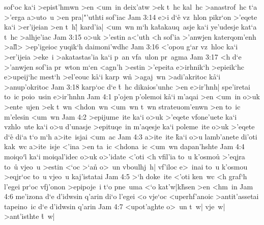 sof`oc
ka`i
>epist'hmwn
>en
<um~in
deix'atw
>ek
t~hc
kal~hc
>anastrof~hc
t`a
>'erga
a>uto~u
>en
pra|"'uthti
sof'iac\bibvsend
\vs Jam 3:14
e>i
d`e\r{}
vz~hlon
pikr`on
>'eqete
ka`i
>er'ijeian
>en
t~h|\r{}
kard'ia|
<um~wn
m`h
ka\r{t}akauq~asje
ka`i
ye'udesje
kat`a
t~hc
>alhje'iac\bibvsend
\vs Jam 3:15
o>uk
>'estin
a<'uth
<h
sof'ia
>'anwjen
katerqom'enh
>al\r{l}>
>ep'igeioc
yuqik`h
daimoni'wdhc\bibvsend
\vs Jam 3:16
<'opou
g`ar
vz~hloc
ka`i
>er'ijeia
>eke~i
>akatastas'ia
ka`i
p~an
vfa~ulon
pr~agma\bibvsend
\vs Jam 3:17
<h
d`e
>'anwjen
sof'ia
pr~wton
m`en
<agn'h
>estin
>'epeita
e>irhnik`h
>epieik`hc
e>upeij`hc
mest`h
>el'eouc
k\r{a}`i
karp~w\r{n}
>agaj~wn
>adi'akritoc
k\r{a}`i
>anup'okritoc\bibvsend
\vs Jam 3:18
karp`oc
d`e
\r{t}~hc
dikaios'unhc
>en
e>ir'hnh|
spe'iretai
to~ic
poio~usin
e>ir'hnhn\bibvsend
\vs Jam 4:1
p'ojen
p'olemoi
k\r{a}`i
m'aqai
>en
<um~in
o>uk
>ente~ujen
>ek
t~wn
<hdon~wn
<um~wn
t~wn
strateuom'enwn
>en
to~ic
m'elesin
<um~wn\bibvsend
\vs Jam 4:2
>epijume~ite
ka`i
o>uk
>'eqete
vfone'uete
ka`i
vzhlo~ute
ka`i
o>u
d'unasje
>epituqe~in
m'aqesje
ka`i
poleme~ite
o>uk
>'eqete
d`e\r{}
di`a
t`o
m`h
a>ite~isjai
<um~ac\bibvsend
\vs Jam 4:3
a>ite~ite
\r{k}a`i
o>u
lamb'anete
di'oti
kak~wc
a>ite~isje
<'ina
>en
ta~ic
<hdona~ic
<um~wn
dapan'hshte\bibvsend
\vs Jam 4:4
moiqo`i\r{}
ka`i
moiqal'idec
o>uk
o>'idate
<'oti
<h
vfil'ia
to~u
k'osmo\r{u}
>'eqjra
to~u\r{}
vjeo~u
>estin
<`oc
>`a\r{n}
o>~un
vboulhj~h|
vf'iloc
e>~inai
to~u
k'osmou
>eqjr`oc
to~u
vjeo~u
kaj'istatai\bibvsend
\vs Jam 4:5
>`h
doke~ite
<'oti
ken~wc
<h
graf`h
l'egei
pr`oc
vfj'onon
>epipoje~i
t`o
pne~uma
<`o
kat'w|k\r{h}sen
>en
<hm~in\bibvsend
\vs Jam 4:6
me'izona
d`e
d'idwsin
q'arin
di`o
l'egei
<o
vje`oc
<uperhf'anoic
>antit'assetai
tapeino~ic
d`e
d'idwsin
q'arin\bibvsend
\vs Jam 4:7
<upot'aghte
o>~un
t~w|
vje~w|
>ant'isthte
\r{t}~w|
